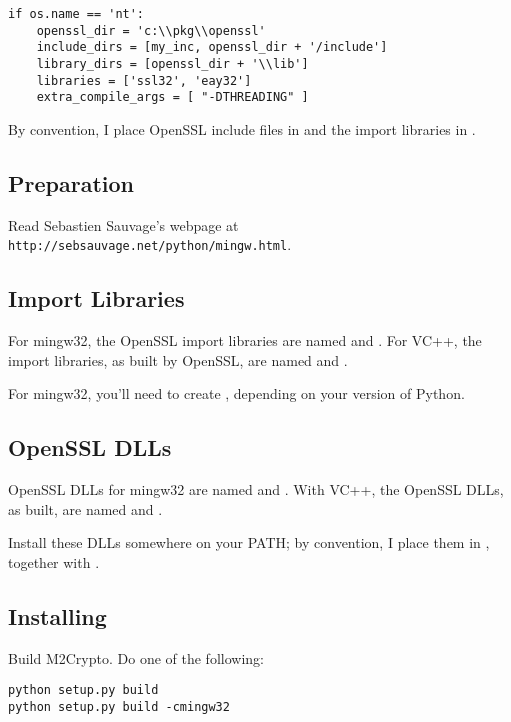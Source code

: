\documentclass{howto}
\begin{document}
\begin{verbatim}
if os.name == 'nt':
    openssl_dir = 'c:\\pkg\\openssl'
    include_dirs = [my_inc, openssl_dir + '/include']
    library_dirs = [openssl_dir + '\\lib']
    libraries = ['ssl32', 'eay32']
    extra_compile_args = [ "-DTHREADING" ]
\end{verbatim}

By convention, I place OpenSSL include files in
 and the import libraries in
.

\subsection{Preparation}

Read Sebastien Sauvage's webpage at
\texttt{http://sebsauvage.net/python/mingw.html}.

\subsection{Import Libraries}

For mingw32, the OpenSSL import libraries are named  and
. For VC++, the import libraries, as built by OpenSSL, are
named  and .

For mingw32, you'll need to create , depending
on your version of Python.

\subsection{OpenSSL DLLs}

OpenSSL DLLs for mingw32 are named  and
. With VC++, the OpenSSL DLLs, as built, are named
 and .

Install these DLLs somewhere on your PATH; by convention, I place them in
, together with .

\subsection{Installing}

Build M2Crypto. Do one of the following:

\begin{verbatim}
python setup.py build
python setup.py build -cmingw32
\end{verbatim}
\end{document}
